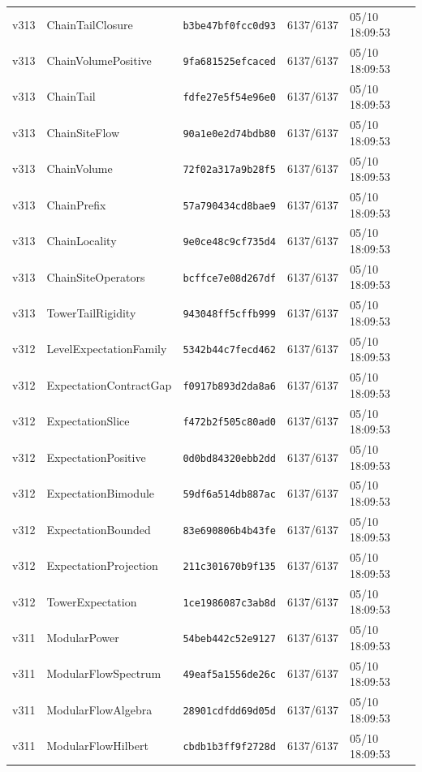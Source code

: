 \documentclass[11pt]{article}
\theoremstyle{definition}\newtheorem{deriv}{Derivação}
\begin{document}
{\begin{longtable}{@{}lllll@{}}
v313 & ChainTailClosure & \texttt{b3be47bf0fcc0d93} & 6137/6137 & 05/10 18:09:53 \\
v313 & ChainVolumePositive & \texttt{9fa681525efcaced} & 6137/6137 & 05/10 18:09:53 \\
v313 & ChainTail & \texttt{fdfe27e5f54e96e0} & 6137/6137 & 05/10 18:09:53 \\
v313 & ChainSiteFlow & \texttt{90a1e0e2d74bdb80} & 6137/6137 & 05/10 18:09:53 \\
v313 & ChainVolume & \texttt{72f02a317a9b28f5} & 6137/6137 & 05/10 18:09:53 \\
v313 & ChainPrefix & \texttt{57a790434cd8bae9} & 6137/6137 & 05/10 18:09:53 \\
v313 & ChainLocality & \texttt{9e0ce48c9cf735d4} & 6137/6137 & 05/10 18:09:53 \\
v313 & ChainSiteOperators & \texttt{bcffce7e08d267df} & 6137/6137 & 05/10 18:09:53 \\
v313 & TowerTailRigidity & \texttt{943048ff5cffb999} & 6137/6137 & 05/10 18:09:53 \\
v312 & LevelExpectationFamily & \texttt{5342b44c7fecd462} & 6137/6137 & 05/10 18:09:53 \\
v312 & ExpectationContractGap & \texttt{f0917b893d2da8a6} & 6137/6137 & 05/10 18:09:53 \\
v312 & ExpectationSlice & \texttt{f472b2f505c80ad0} & 6137/6137 & 05/10 18:09:53 \\
v312 & ExpectationPositive & \texttt{0d0bd84320ebb2dd} & 6137/6137 & 05/10 18:09:53 \\
v312 & ExpectationBimodule & \texttt{59df6a514db887ac} & 6137/6137 & 05/10 18:09:53 \\
v312 & ExpectationBounded & \texttt{83e690806b4b43fe} & 6137/6137 & 05/10 18:09:53 \\
v312 & ExpectationProjection & \texttt{211c301670b9f135} & 6137/6137 & 05/10 18:09:53 \\
v312 & TowerExpectation & \texttt{1ce1986087c3ab8d} & 6137/6137 & 05/10 18:09:53 \\
v311 & ModularPower & \texttt{54beb442c52e9127} & 6137/6137 & 05/10 18:09:53 \\
v311 & ModularFlowSpectrum & \texttt{49eaf5a1556de26c} & 6137/6137 & 05/10 18:09:53 \\
v311 & ModularFlowAlgebra & \texttt{28901cdfdd69d05d} & 6137/6137 & 05/10 18:09:53 \\
v311 & ModularFlowHilbert & \texttt{cbdb1b3ff9f2728d} & 6137/6137 & 05/10 18:09:53 \\

\end{longtable}}
\end{document}
